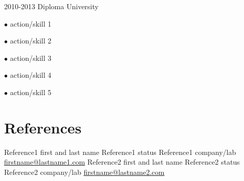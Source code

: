 \documentclass[]{classes/friggeri-resume}
\begin{document}
		\Education
		{2010-2013}
		{Diploma}
		{University}
		{
			$\bullet$ action/skill 1

			$\bullet$ action/skill 2

			$\bullet$ action/skill 3

			$\bullet$ action/skill 4

			$\bullet$ action/skill 5
		}



	\section{\faEdit\space References}

		\References
		{Reference1 first and last name}
		{Reference1 status}
		{Reference1 company/lab}
		{\href{mailto:firstname@lastname1.com}{\faInbox\space firstname@lastname1.com}}
		{Reference2 first and last name}
		{Reference2 status}
		{Reference2 company/lab}
		{\href{mailto:firstname@lastname2.com}{\faInbox\space firstname@lastname2.com}}

\end{document}
